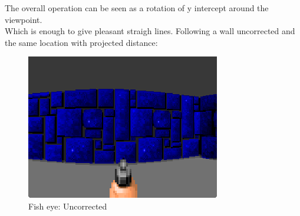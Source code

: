 The overall operation can be seen as a rotation of y intercept around the viewpoint.\\
 Which is enough to give pleasant straigh lines. Following a wall uncorrected and the same location with projected distance:\\
 \begin{figure}[H]
\centering
 \includegraphics[width=\textwidth]{imgs/fish_eye/fish_eye.png}
  \caption{Fish eye: Uncorrected} 
 \end{figure}
 

